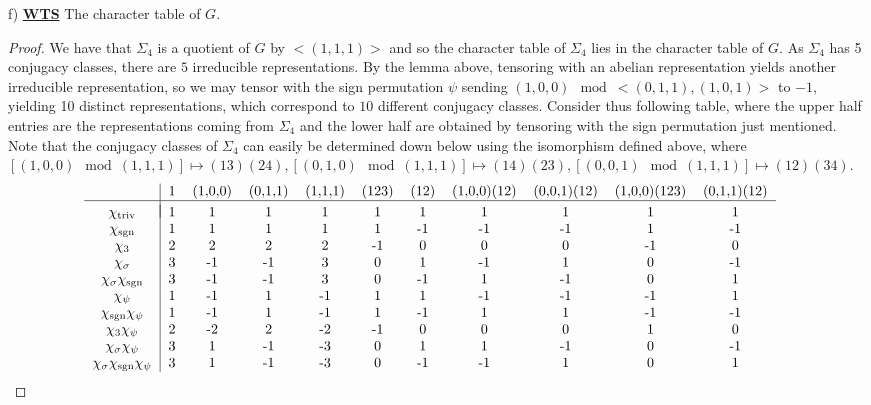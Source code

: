 \documentclass{article}
\begin{document}
f) \textbf{\underline{WTS}} The character table of $G$.
\begin{proof}
  We have that $\Sigma_{4}$ is a quotient of $G$ by $<(1,1,1)>$ and so the character table of $\Sigma_{4}$ lies in the character table of $G$. As $\Sigma_{4}$ has 5 conjugacy classes, there are $5$ irreducible representations. By the lemma above, tensoring with an abelian representation yields another irreducible representation, so we may tensor with the sign permutation $\psi$ sending $(1,0,0) \mod <(0,1,1),(1,0,1)>$ to $-1$, yielding 10 distinct representations, which correspond to $10$ different conjugacy classes. Consider thus following table, where the upper half entries are the representations coming from $\Sigma_{4}$ and the lower half are obtained by tensoring with the sign permutation just mentioned. Note that the conjugacy classes of $\Sigma_{4}$ can easily be determined down below using the isomorphism defined above, where $[(1,0,0) \mod (1,1,1)] \mapsto (13)(24), [(0,1,0) \mod(1,1,1)] \mapsto (14)(23), [(0,0,1) \mod (1,1,1)] \mapsto (12)(34)$. 
  \[\hspace{-0.15in}
    \begin{tabular}{c|cccccccccc} 
      & 1 & (1,0,0) & (0,1,1) & (1,1,1) & (123) & (12) & (1,0,0)(12) & (0,0,1)(12) & (1,0,0)(123) & (0,1,1)(12) \\
      \hline  \vspace{-0.13in} \\
$\chi_{\text{triv}}$ & 1 & 1 & 1 & 1 & 1 & 1 & 1 & 1 & 1 & 1 \\
$\chi_{\text{sgn}}$ & 1 & 1 & 1 & 1 & 1 & -1 & -1 & -1 & 1 & -1 \\
$\chi_{3}$ & 2 & 2 & 2 & 2 & -1 & 0 & 0 & 0 & -1 & 0 \\
$\chi_{\sigma}$ & 3 & -1 & -1 & 3 & 0 & 1 & -1 & 1 & 0 & -1 \\
$\chi_{\sigma}\chi_{\text{sgn}}$ & 3 & -1 & -1 & 3 & 0 & -1 & 1 & -1 & 0 & 1 \\
$\chi_{\psi}$ & 1 & -1 & 1 & -1 & 1 & 1 & -1 & -1 & -1 & 1 \\
$\chi_{\text{sgn}}\chi_{\psi}$ & 1 & -1 & 1 & -1 & 1 & -1 & 1 & 1 & -1 & -1 \\
$\chi_{3}\chi_{\psi}$ & 2 & -2 & 2 & -2 & -1 & 0 & 0 & 0 & 1 & 0 \\
$\chi_{\sigma}\chi_{\psi}$ & 3 & 1 & -1 & -3 & 0 & 1 & 1 & -1 & 0 & -1 \\
$\chi_{\sigma}\chi_{\text{sgn}}\chi_{\psi}$ & 3 & 1 & -1 & -3 & 0 & -1 & -1 & 1 & 0 & 1 \\
    \end{tabular}
    \]
  \end{proof}
  
\end{document}
